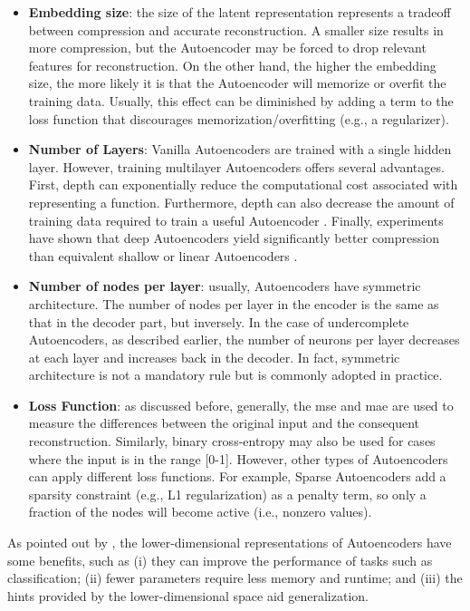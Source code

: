 \begin{itemize}
\item \textbf{Embedding size}: the size of the latent representation represents a tradeoff between compression and accurate reconstruction. A smaller size results in more compression, but the Autoencoder may be forced to drop relevant features for reconstruction. On the other hand, the higher the embedding size, the more likely it is that the Autoencoder will memorize or overfit the training data. Usually, this effect can be diminished by adding a term to the loss function that discourages memorization/overfitting (e.g., a regularizer).

\item \textbf{Number of Layers}: Vanilla Autoencoders are trained with a single hidden layer. However, training multilayer Autoencoders offers several advantages. First, depth can exponentially reduce the computational cost associated with representing a function. Furthermore, depth can also decrease the amount of training data required to train a useful Autoencoder \citep[p.~506]{goodfellow2016deep}. Finally, experiments have shown that deep Autoencoders yield significantly better compression than equivalent shallow or linear Autoencoders \citep{hinton2006reducing}.

\item \textbf{Number of nodes per layer}: usually, Autoencoders have symmetric architecture. The number of nodes per layer in the encoder is the same as that in the decoder part, but inversely. In the case of undercomplete Autoencoders, as described earlier, the number of neurons per layer decreases at each layer and increases back in the decoder. In fact, symmetric architecture is not a mandatory rule but is commonly adopted in practice.

\item \textbf{Loss Function}: as discussed before, generally, the \acs{mse} and \acs{mae} are used to measure the differences between the original input and the consequent reconstruction. Similarly, binary cross-entropy may also be used for cases where the input is in the range [0-1]. However, other types of Autoencoders can apply different loss functions. For example, Sparse Autoencoders add a sparsity constraint (e.g., L1 regularization) as a penalty term, so only a fraction of the nodes will become active (i.e., nonzero values).
\end{itemize}

As pointed out by \cite{lecun2015deep}, the lower-dimensional representations of Autoencoders have some benefits, such as (i) they can improve the performance of tasks such as classification; (ii) fewer parameters require less memory and runtime; and (iii) the hints provided by the lower-dimensional space aid generalization.

